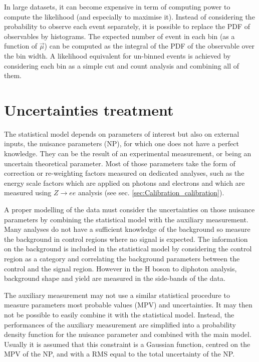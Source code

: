 In large datasets, it can become expensive in term of computing power to compute the likelihood (and especially to maximise it).
Instead of considering the probability to observe each event separately, it is possible to replace the PDF of observables by histograms.
The expected number of event in each bin (as a function of \(\vec{\mu}\)) can be computed as the integral of the PDF of the observable over the bin width.
A likelihood equivalent  for un-binned events is achieved by considering each bin as a simple cut and count analysis and combining all of them.


\section{Uncertainties treatment}
\label{sec:org9cc7929}
\label{sec:stat_NP}

The statistical model depends on parameters of interest but also on external inputs, the nuisance parameters (NP), for which one does not have a perfect knowledge.
They can be the result of an experimental measurement, or being an uncertain theoretical parameter.
Most of those parameters take the form of correction or re-weighting factors measured on dedicated analyses, such as the energy scale factors which are applied on photons and electrons and which are measured using $Z\rightarrow ee$ analysis (see sec. \ref{sec:Calibration_calibration}).

A proper modelling of the data must consider the uncertainties on those nuisance parameters by combining the statistical model with the auxiliary measurement.
Many analyses do not have a sufficient knowledge of the background so measure the background in control regions where no signal is expected.
The information on the background is included in the statistical model by considering the control region as a category and correlating the background parameters between the control and the signal region.
However in the H boson to diphoton analysis, background shape and yield are measured in the side-bands of the data.

The auxiliary measurement may not use a similar statistical procedure to measure parameters most probable values (MPV) and uncertainties.
It may then not be possible to easily combine it with the statistical model.
Instead, the performances of the auxiliary measurement are simplified into a probability density function for the nuisance parameter and combined with the main model.
Usually it is assumed that this constraint is a Gaussian function, centred on the MPV of the NP, and with a RMS equal to the total uncertainty of the NP.



